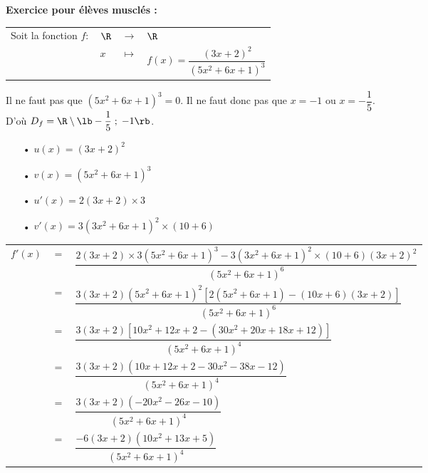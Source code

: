 \newpage

\vspace*{-2cm}

\textbf{Exercice pour élèves musclés :}

\begin{tabular}{llll}
Soit la fonction $f :$ & $\R$ & $\longrightarrow$ & $\R$ \\
& $x$ & $\longmapsto$ & $f(x) =  \dfrac{\left(3x+2\right)^2}{\left(5x^2 + 6x + 1\right)^3} $ \\
\end{tabular}

Il ne faut pas que $\left(5x^2 + 6x + 1\right)^3 = 0$. Il ne faut donc pas que $x = -1$ ou $x = -\dfrac{1}{5}$. \\

D'où $D_f = \R \setminus \lb -\dfrac{1}{5} \; ; \; -1 \rb$. \\

\begin{itemize}
\item[•] $u(x) = \left(3x + 2\right)^2$
\item[•] $v(x) = \left(5x^2 + 6x + 1\right)^3$
\item[•] $u'(x) = 2\left(3x + 2\right)\times 3$
\item[•] $v'(x) = 3\left(3x^2 + 6x + 1\right)^2 \times \left(10+6\right)$
\end{itemize}

\vspace*{.3cm}

\begin{tabular}{lll}
$f'(x)$ & $=$ & $\dfrac{2\left(3x + 2\right) \times 3\left(5x^2 + 6x + 1\right)^3 - 3\left(3x^2 + 6x + 1\right)^2 \times \left(10+6\right)\left(3x + 2\right)^2}{\left(5x^2 + 6x + 1\right)^6}$ \vspace*{.3cm} \\ 
& $=$ & $\dfrac{3\left(3x + 2\right)\left(5x^2 + 6x + 1\right)^2\left[2\left(5x^2 + 6x + 1\right) - \left(10x + 6\right)\left(3x +2 \right)\right]}{\left(5x^2 + 6x + 1\right)^6}$ \vspace*{.3cm} \\ 
& $=$ & $\dfrac{3\left(3x + 2\right)\left[10x^2 + 12x + 2 - \left(30x^2 + 20x + 18x + 12\right)\right]}{\left(5x^2 + 6x + 1\right)^4}$ \vspace*{.3cm} \\ 
& $=$ & $\dfrac{3\left(3x + 2\right)\left(10x + 12x + 2 - 30x^2 - 38x - 12\right)}{\left(5x^2 + 6x + 1\right)^4}$ \vspace*{.3cm} \\ 
& $=$ & $\dfrac{3\left(3x + 2\right)\left(-20x^2 - 26x - 10\right)}{\left(5x^2 + 6x + 1\right)^4}$ \vspace*{.3cm} \\ 
& $=$ & $\dfrac{-6\left(3x + 2\right)\left(10x^2 + 13x + 5\right)}{\left(5x^2 + 6x + 1\right)^4}$ \vspace*{.3cm} \\ 
\end{tabular}

